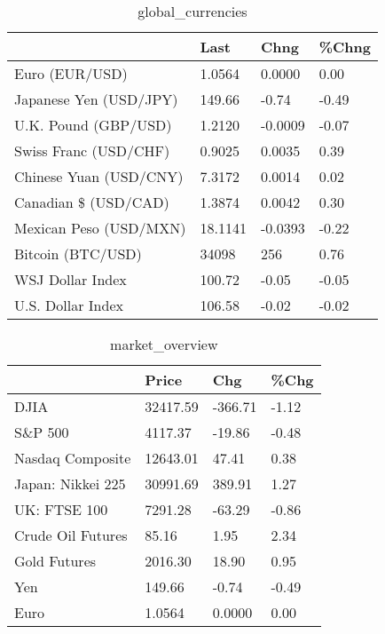 \documentclass{article}%
\begin{document}
%


\begin{table}[htbp]%
\caption{global\_currencies}%
\centering%
\begin{adjustbox}{width=1\textwidth}%
\begin{tabular}{llll}
\toprule
                       &    Last &    Chng & \%Chng \\
\midrule
        Euro (EUR/USD) &  1.0564 &  0.0000 &  0.00 \\
Japanese Yen (USD/JPY) &  149.66 &   -0.74 & -0.49 \\
  U.K. Pound (GBP/USD) &  1.2120 & -0.0009 & -0.07 \\
 Swiss Franc (USD/CHF) &  0.9025 &  0.0035 &  0.39 \\
Chinese Yuan (USD/CNY) &  7.3172 &  0.0014 &  0.02 \\
  Canadian \$ (USD/CAD) &  1.3874 &  0.0042 &  0.30 \\
Mexican Peso (USD/MXN) & 18.1141 & -0.0393 & -0.22 \\
     Bitcoin (BTC/USD) &   34098 &     256 &  0.76 \\
      WSJ Dollar Index &  100.72 &   -0.05 & -0.05 \\
     U.S. Dollar Index &  106.58 &   -0.02 & -0.02 \\
\bottomrule
\end{tabular}
%
\end{adjustbox}%
\end{table}

%


\begin{table}[htbp]%
\caption{market\_overview}%
\centering%
\begin{adjustbox}{width=1\textwidth}%
\begin{tabular}{llll}
\toprule
                  &    Price &     Chg &  \%Chg \\
\midrule
             DJIA & 32417.59 & -366.71 & -1.12 \\
          S\&P 500 &  4117.37 &  -19.86 & -0.48 \\
 Nasdaq Composite & 12643.01 &   47.41 &  0.38 \\
Japan: Nikkei 225 & 30991.69 &  389.91 &  1.27 \\
     UK: FTSE 100 &  7291.28 &  -63.29 & -0.86 \\
Crude Oil Futures &    85.16 &    1.95 &  2.34 \\
     Gold Futures &  2016.30 &   18.90 &  0.95 \\
              Yen &   149.66 &   -0.74 & -0.49 \\
             Euro &   1.0564 &  0.0000 &  0.00 \\
\bottomrule
\end{tabular}
%
\end{adjustbox}%
\end{table}

%
\end{document}
